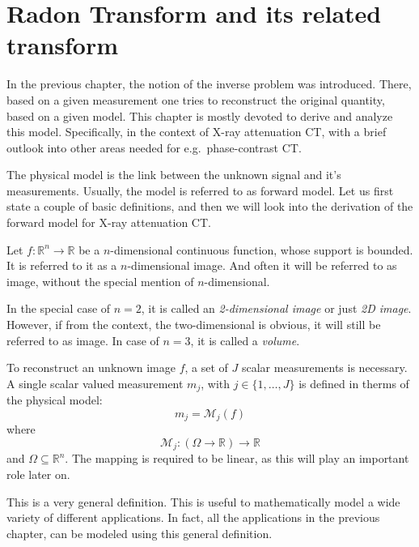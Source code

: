 \chapter{Radon Transform and its related transform}\label{chap:radon_transform_and_related}

In the previous chapter, the notion of the inverse problem was introduced. There, based on a given
measurement one tries to reconstruct the original quantity, based on a given model. This chapter is
mostly devoted to derive and analyze this model. Specifically, in the context of X-ray attenuation
CT, with a brief outlook into other areas needed for e.g.\ phase-contrast CT\@.

The physical model is the link between the unknown signal and it's measurements. Usually, the model
is referred to as forward model. Let us first state a couple of basic definitions, and then we will
look into the derivation of the forward model for X-ray attenuation CT\@.

\begin{definition}[Image]\label{def:image}
	Let \(f\colon \mathbb{R}^n \to \mathbb{R}\) be a \(n\)-dimensional continuous function,
	whose support is bounded. It is referred to it as a \(n\)-dimensional image. And often it will
	be referred to as image, without the special mention of \(n\)-dimensional.
\end{definition}

In the special case of \(n=2\), it is called an \textit{2-dimensional image} or just
\textit{2D image}. However, if from the context, the two-dimensional is obvious, it will still be
referred to as image. In case of \(n=3\), it is called a \textit{volume}.

\begin{definition}\label{def:forward-model}
	To reconstruct an unknown image \(f\), a set of \(J\) scalar measurements is necessary.
	A single scalar valued measurement \(m_j\), with \(j \in \{1, \dots, J\}\) is defined in therms
	of the physical model:
	\[ m_j = \mathscr{M}_j(f)\]
	where
	\[ \mathscr{M}_j\colon (\Omega \to \mathbb{R}) \to \mathbb{R} \]
	and \(\Omega \subseteq \mathbb{R}^n\). The mapping is required to be linear, as this will play an
	important role later on.
\end{definition}

This is a very general definition. This is useful to mathematically model a wide variety of
different applications. In fact, all the applications in the previous chapter, can be modeled using
this general definition.

